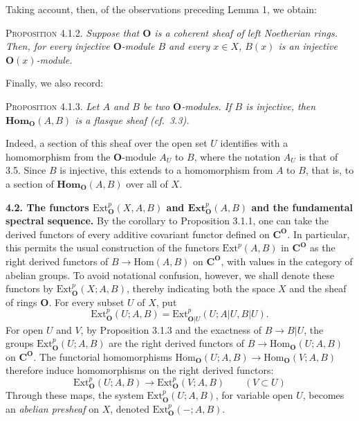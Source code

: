 \clearpage
{}

Taking account, then, of the observations preceding Lemma 1, we obtain:

\textsc{Proposition 4.1.2.} \textit{Suppose that ${\mathbf O}$ is a coherent
sheaf of left Noetherian rings. Then, for every injective ${\mathbf O}$-module $B$ and
every $x\in X$, $B(x)$ is an injective ${\mathbf O}(x)$-module.}

Finally, we also record:

\textsc{Proposition 4.1.3.} \textit{Let $A$ and $B$ be two
${\mathbf O}$-modules. If $B$ is injective, then $\mathbf{Hom}_{\mathbf O}(A,B)$ is a flasque sheaf
\textup{(}cf.\ \textup{3.3)}.}

Indeed, a section of this sheaf over the open set $U$ identifies with a
homomorphism from the ${\mathbf O}$-module $A_U$ to $B$, where the notation $A_U$ is
that of 3.5. Since $B$ is injective, this extends to a homomorphism from $A$ to
$B$, that is, to a section of $\mathbf{Hom}_{\mathbf O}(A,B)$ over all of $X$.

\textbf{4.2. The functors $\mathrm{Ext}_{\mathbf O}^p(X,A,B)$ and
$\mathbf{Ext}_{\mathbf O}^p(A,B)$ and the fundamental spectral sequence.}
By the corollary to Proposition 3.1.1, one can take the derived functors of
every additive covariant functor defined on $\mathbf C^{\mathbf O}$. In particular, this permits
the usual construction of the functors $\mathrm{Ext}^p(A,B)$ in $\mathbf C^{\mathbf O}$ as
the right derived functors of $B\to\mathrm{Hom}(A,B)$ on $\mathbf C^{\mathbf O}$,
with values in the category of abelian groups. To avoid notational confusion,
however, we shall denote these functors by $\mathrm{Ext}_{\mathbf O}^p(X;A,B)$, thereby
indicating both the space $X$ and the sheaf of rings ${\mathbf O}$. For every subset $U$
of $X$, put
\[
\tag{4.2.1}
\mathrm{Ext}_{\mathbf O}^p(U;A,B)=
\mathrm{Ext}_{{\mathbf O}|U}^p(U;A|U,B|U).
\]
For open $U$ and $V$, by Proposition 3.1.3 and the exactness of $B\to B|U$, the groups
$\mathrm{Ext}_{\mathbf O}^p(U;A,B)$ are the right derived functors of
$B\to\mathrm{Hom}_{\mathbf O}(U;A,B)$ on $\mathbf C^{\mathbf O}$. The functorial homomorphisms
$\mathrm{Hom}_{\mathbf O}(U;A,B)\to\mathrm{Hom}_{\mathbf O}(V;A,B)$ therefore induce
homomorphisms on the right derived functors:
\[
\tag{4.2.2}
\mathrm{Ext}_{\mathbf O}^p(U;A,B)\to\mathrm{Ext}_{\mathbf O}^p(V;A,B)
\qquad(V\subset U)
\]
Through these maps, the system $\mathrm{Ext}_{\mathbf O}^p(U;A,B)$, for variable open
$U$, becomes an \textit{abelian presheaf} on $X$, denoted
$\mathrm{Ext}_{\mathbf O}^p(-;A,B)$.

